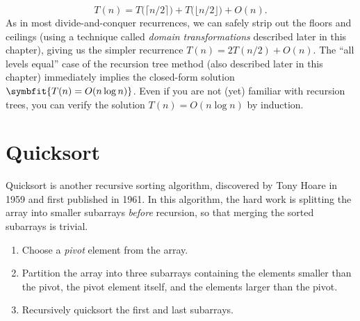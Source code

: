 \[
T(n) = T\bigl(\lceil n/2\rceil\bigr) + T\bigl(\lfloor n/2\rfloor\bigr) + O(n).
\]
As in most divide-and-conquer recurrences, we can safely strip out the floors and ceilings (using a technique called \emph{domain transformations} described later in this chapter), giving us the simpler recurrence $T(n) = 2T(n/2) + O(n)$. The “all levels equal” case of the recursion tree method (also described later in this chapter) immediately implies the closed-form solution $\symbfit{T(n) = O(n \log n)}$. Even if you are not (yet) familiar with recursion trees, you can verify the solution $T(n) = O(n \log n)$ by induction.

\section{Quicksort}
\label{sec:1.5}

Quicksort is another recursive sorting algorithm, discovered by Tony Hoare in 1959 and first published in 1961. In this algorithm, the hard work is splitting the array into smaller subarrays \emph{before} recursion, so that merging the sorted subarrays is trivial.

\begin{enumerate}
\item Choose a \emph{pivot} element from the array.

\item Partition the array into three subarrays containing the elements smaller than the pivot, the pivot element itself, and the elements larger than the pivot.

\item Recursively quicksort the first and last subarrays.
\end{enumerate}

